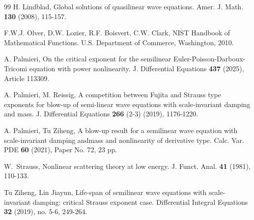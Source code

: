 \documentclass[11pt,twoside]{article}
\theoremstyle{plain}
\theoremstyle{definition}
\theoremstyle{remark}
\numberwithin{equation}{section}
\begin{document}
\begin{thebibliography}{99}
 H. Lindblad, Global solutions of quasilinear wave equations.
Amer. J. Math. \textbf{130} (2008), 115-157.



F.W.J. Olver, D.W. Lozier, R.F. Boisvert, C.W. Clark, NIST Handbook of Mathematical Functions. U.S. Department
of Commerce, Washington, 2010.


 A. Palmieri,
On the critical exponent for the semilinear Euler-Poisson-Darboux-Tricomi equation with power nonlinearity.
J. Differential Equations \textbf{437} (2025), Article 113309.


A. Palmieri, M. Reissig, A competition between Fujita and Strauss type exponents for blow-up of semi-linear wave
equations with scale-invariant damping and mass. J. Differential Equations \textbf{266} (2-3) (2019), 1176-1220.


 A. Palmieri, Tu Ziheng,
A blow-up result for a semilinear wave equation with
scale-invariant damping andmass and nonlinearity of
derivative type. Calc. Var. PDE \textbf{60} (2021), Paper No. 72, 23 pp.



 W.~Strauss, Nonlinear scattering theory at
low energy. J. Funct. Anal. \textbf{41} (1981), 110-133.







 Tu Ziheng, Lin Jiayun, Life-span of semilinear wave equations with scale-invariant damping: critical Strauss exponent case.
Differential Integral Equations \textbf{32} (2019), no. 5-6, 249-264.




\end{thebibliography}
\end{document}
